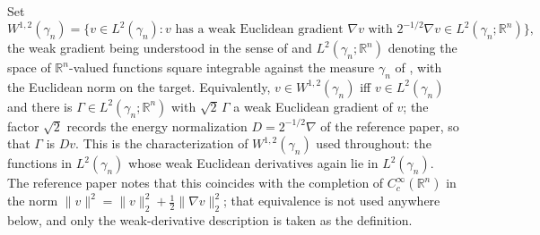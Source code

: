 \begin{definition}
Set
\[
  W^{1,2}(\gamma_n)
    = \bigl\{ v \in L^2(\gamma_n) :
        \text{$v$ has a weak Euclidean gradient $\nabla v$ with }
        2^{-1/2}\nabla v \in L^2(\gamma_n;\mathbb{R}^n) \bigr\},
\]
the weak gradient being understood in the sense of  and
$L^2(\gamma_n;\mathbb{R}^n)$ denoting the space of $\mathbb{R}^n$-valued functions
square integrable against the measure $\gamma_n$ of , with
the Euclidean norm on the target.  Equivalently, $v \in W^{1,2}(\gamma_n)$ iff
$v \in L^2(\gamma_n)$ and there is $\Gamma \in L^2(\gamma_n;\mathbb{R}^n)$ with
$\sqrt2\,\Gamma$ a weak Euclidean gradient of $v$; the factor $\sqrt2$ records the
energy normalization $D = 2^{-1/2}\nabla$ of the reference paper, so that $\Gamma$
is $Dv$.  This is the characterization of $W^{1,2}(\gamma_n)$ used throughout: the
functions in $L^2(\gamma_n)$ whose weak Euclidean derivatives again lie in
$L^2(\gamma_n)$.  The reference paper notes that this coincides with the
completion of $C_c^\infty(\mathbb{R}^n)$ in the norm
$\|v\|^2 = \|v\|_2^2 + \tfrac12\|\nabla v\|_2^2$; that equivalence is not used
anywhere below, and only the weak-derivative description is taken as the
definition.
\end{definition}
